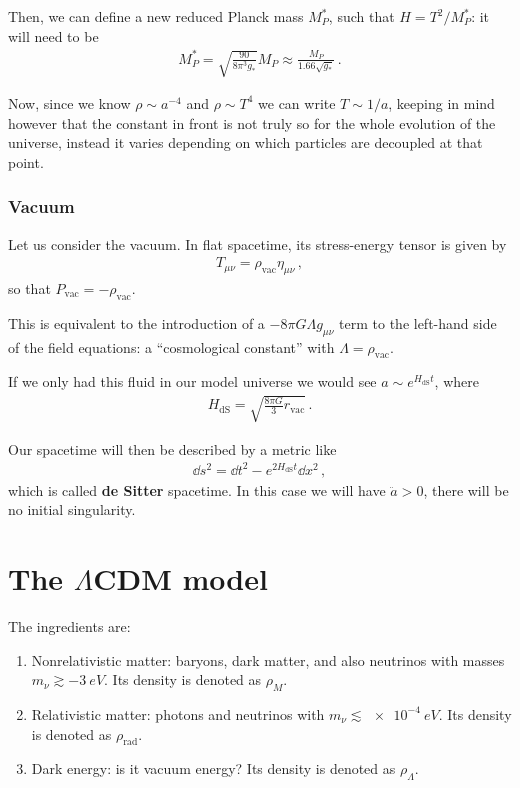 \documentclass[main.tex]{subfiles}
\begin{document}
Then, we can define a new reduced Planck mass \(M_P^{*}\), such that \(H = T^2 / M_P^{*}\): it will need to be 
%
\begin{align} \label{eq:reduced-planck-mass}
M_{P}^{*} = \sqrt{\frac{90}{8 \pi^3 g_{*}}} M_P \approx \frac{M_P}{\num{1.66}\sqrt{g_*}}
\,.
\end{align}

Now, since we know \(\rho \sim a^{-4}\) and \(\rho \sim T^{4}\) we can write \(T \sim 1/ a\), keeping in mind however that the constant in front is not truly so for the whole evolution of the universe, instead it varies depending on which particles are decoupled at that point. 

\subsubsection{Vacuum}

Let us consider the vacuum. In flat spacetime, its stress-energy tensor is given by 
%
\begin{align}
T_{\mu \nu } = \rho _{\text{vac}} \eta_{\mu \nu }
\,,
\end{align}
%
so that \(P _{\text{vac}} = - \rho _{\text{vac}}\).

This is equivalent to the introduction of a \(- 8 \pi G \Lambda g_{\mu \nu }\) term to the left-hand side of the field equations: a ``cosmological constant'' with \(\Lambda = \rho _{\text{vac}}\).

If we only had this fluid in our model universe we would see \(a \sim e^{H _{\text{dS}}t}\), where 
%
\begin{align}
H _{\text{dS}} = \sqrt{\frac{8 \pi G}{3} r _{\text{vac}}}
\,.
\end{align}

Our spacetime will then be described by a metric like 
%
\begin{align}
\dd{s^2} = \dd{t^2} - e^{2H _{\text{dS}}t } \dd{x}^2
\,,
\end{align}
%
which is called \textbf{de Sitter} spacetime.
In this case we will have \(\ddot{a} > 0\), there will be no initial singularity.

\section{The \(\Lambda \)CDM model}

The ingredients are: 
\begin{enumerate}
    \item Nonrelativistic matter: baryons, dark matter, and also neutrinos with masses \(m_{\nu } \gtrsim \SI{-3}{eV}\). Its density is denoted as \(\rho_{M}\).
    \item Relativistic matter: photons and neutrinos with \(m_\nu \lesssim \SI{e-4}{eV}\). Its density is denoted as \(\rho _{\text{rad}}\).
    \item Dark energy: is it vacuum energy? Its density is denoted as \(\rho_{\Lambda }\).
\end{enumerate}
\end{document}
